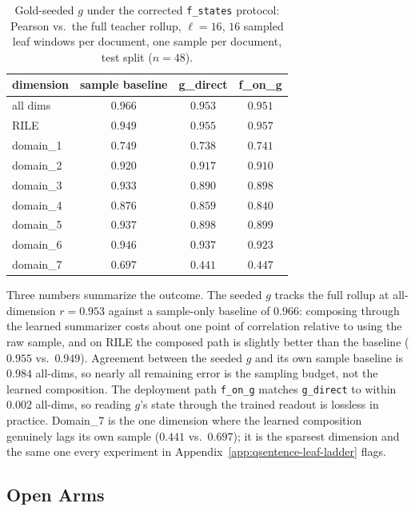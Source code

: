 \begin{table}[htbp]
    \centering
    \begin{tabular}{lccc}
    \toprule
    dimension & sample baseline & g\_direct & f\_on\_g \\
    \midrule
    all dims  & $0.966$ & $0.953$ & $0.951$ \\
    RILE      & $0.949$ & $0.955$ & $0.957$ \\
    domain\_1 & $0.749$ & $0.738$ & $0.741$ \\
    domain\_2 & $0.920$ & $0.917$ & $0.910$ \\
    domain\_3 & $0.933$ & $0.890$ & $0.898$ \\
    domain\_4 & $0.876$ & $0.859$ & $0.840$ \\
    domain\_5 & $0.937$ & $0.898$ & $0.899$ \\
    domain\_6 & $0.946$ & $0.937$ & $0.923$ \\
    domain\_7 & $0.697$ & $0.441$ & $0.447$ \\
    \bottomrule
    \end{tabular}
    \caption{Gold-seeded $g$ under the corrected \texttt{f\_states}
    protocol: Pearson vs.\ the full teacher rollup, $\ell = 16$, $16$
    sampled leaf windows per document, one sample per document, test
    split ($n=48$).}
    \label{tab:app-gold-seeding}
\end{table}

Three numbers summarize the outcome. The seeded $g$ tracks the full
rollup at all-dimension $r = 0.953$ against a sample-only baseline of
$0.966$: composing through the learned summarizer costs about one
point of correlation relative to using the raw sample, and on RILE the
composed path is slightly better than the baseline ($0.955$ vs.\
$0.949$). Agreement between the seeded $g$ and its own sample baseline
is $0.984$ all-dims, so nearly all remaining error is the sampling
budget, not the learned composition. The deployment path
\texttt{f\_on\_g} matches \texttt{g\_direct} to within $0.002$
all-dims, so reading $g$'s state through the trained readout is
lossless in practice. Domain\_7 is the one dimension where the learned
composition genuinely lags its own sample ($0.441$ vs.\ $0.697$); it
is the sparsest dimension and the same one every experiment in
Appendix~\ref{app:qsentence-leaf-ladder} flags.

\subsection{Open Arms}

